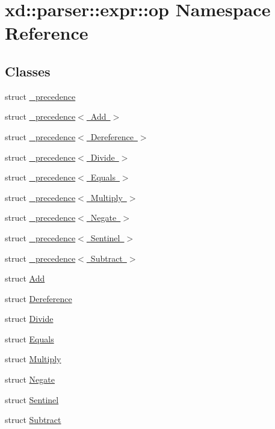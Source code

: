 \hypertarget{namespacexd_1_1parser_1_1expr_1_1op}{}\section{xd\+:\+:parser\+:\+:expr\+:\+:op Namespace Reference}
\label{namespacexd_1_1parser_1_1expr_1_1op}
\subsection*{Classes}
\begin{DoxyCompactItemize}
\item 
struct \mbox{\hyperlink{structxd_1_1parser_1_1expr_1_1op_1_1__precedence}{\+\_\+precedence}}
\item 
struct \mbox{\hyperlink{structxd_1_1parser_1_1expr_1_1op_1_1__precedence_3_01_add_01_4}{\+\_\+precedence$<$ Add $>$}}
\item 
struct \mbox{\hyperlink{structxd_1_1parser_1_1expr_1_1op_1_1__precedence_3_01_dereference_01_4}{\+\_\+precedence$<$ Dereference $>$}}
\item 
struct \mbox{\hyperlink{structxd_1_1parser_1_1expr_1_1op_1_1__precedence_3_01_divide_01_4}{\+\_\+precedence$<$ Divide $>$}}
\item 
struct \mbox{\hyperlink{structxd_1_1parser_1_1expr_1_1op_1_1__precedence_3_01_equals_01_4}{\+\_\+precedence$<$ Equals $>$}}
\item 
struct \mbox{\hyperlink{structxd_1_1parser_1_1expr_1_1op_1_1__precedence_3_01_multiply_01_4}{\+\_\+precedence$<$ Multiply $>$}}
\item 
struct \mbox{\hyperlink{structxd_1_1parser_1_1expr_1_1op_1_1__precedence_3_01_negate_01_4}{\+\_\+precedence$<$ Negate $>$}}
\item 
struct \mbox{\hyperlink{structxd_1_1parser_1_1expr_1_1op_1_1__precedence_3_01_sentinel_01_4}{\+\_\+precedence$<$ Sentinel $>$}}
\item 
struct \mbox{\hyperlink{structxd_1_1parser_1_1expr_1_1op_1_1__precedence_3_01_subtract_01_4}{\+\_\+precedence$<$ Subtract $>$}}
\item 
struct \mbox{\hyperlink{structxd_1_1parser_1_1expr_1_1op_1_1_add}{Add}}
\item 
struct \mbox{\hyperlink{structxd_1_1parser_1_1expr_1_1op_1_1_dereference}{Dereference}}
\item 
struct \mbox{\hyperlink{structxd_1_1parser_1_1expr_1_1op_1_1_divide}{Divide}}
\item 
struct \mbox{\hyperlink{structxd_1_1parser_1_1expr_1_1op_1_1_equals}{Equals}}
\item 
struct \mbox{\hyperlink{structxd_1_1parser_1_1expr_1_1op_1_1_multiply}{Multiply}}
\item 
struct \mbox{\hyperlink{structxd_1_1parser_1_1expr_1_1op_1_1_negate}{Negate}}
\item 
struct \mbox{\hyperlink{structxd_1_1parser_1_1expr_1_1op_1_1_sentinel}{Sentinel}}
\item 
struct \mbox{\hyperlink{structxd_1_1parser_1_1expr_1_1op_1_1_subtract}{Subtract}}
\end{DoxyCompactItemize}
